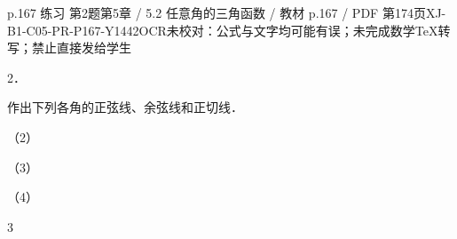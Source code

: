 \begin{bankitem}{p.167 练习 第2题}{第5章 / 5.2 任意角的三角函数 / 教材 p.167 / PDF 第174页}{XJ-B1-C05-PR-P167-Y1442}{OCR未校对：公式与文字均可能有误；未完成数学TeX转写；禁止直接发给学生}
\begin{ocrdraft}
\par
2．
\par
作出下列各角的正弦线、余弦线和正切线．
\par
（2）
\par
（3）
\par
（4）
\par
3
\end{ocrdraft}
\end{bankitem}
